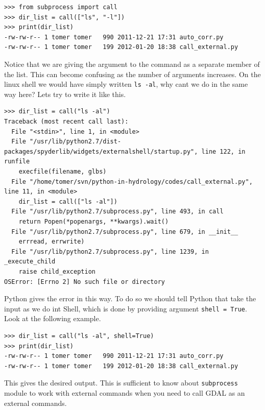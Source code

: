 \documentclass[10pt]{book}
\begin{document}
\beforeverb \begin{verbatim}
>>> from subprocess import call
>>> dir_list = call(["ls", "-l"])
>>> print(dir_list)
-rw-rw-r-- 1 tomer tomer   990 2011-12-21 17:31 auto_corr.py
-rw-rw-r-- 1 tomer tomer   199 2012-01-20 18:38 call_external.py
\end{verbatim} \afterverb
Notice that we are giving the argument to the command as a separate member of the list. This can become confusing as the number of arguments increases. On the linux shell we would have simply written \verb"ls -al", why cant we do in the same way here? Lets try to write it like this.
\beforeverb \begin{verbatim}
>>> dir_list = call("ls -al")
Traceback (most recent call last):
  File "<stdin>", line 1, in <module>
  File "/usr/lib/python2.7/dist-packages/spyderlib/widgets/externalshell/startup.py", line 122, in runfile
    execfile(filename, glbs)
  File "/home/tomer/svn/python-in-hydrology/codes/call_external.py", line 11, in <module>
    dir_list = call(["ls -al"])
  File "/usr/lib/python2.7/subprocess.py", line 493, in call
    return Popen(*popenargs, **kwargs).wait()
  File "/usr/lib/python2.7/subprocess.py", line 679, in __init__
    errread, errwrite)
  File "/usr/lib/python2.7/subprocess.py", line 1239, in _execute_child
    raise child_exception
OSError: [Errno 2] No such file or directory
\end{verbatim} \afterverb
Python gives the error in this way. To do so we should tell Python that take the input as we do int Shell, which is done by providing argument \verb"shell = True". Look at the following example.
\beforeverb \begin{verbatim}
>>> dir_list = call("ls -al", shell=True)
>>> print(dir_list)
-rw-rw-r-- 1 tomer tomer   990 2011-12-21 17:31 auto_corr.py
-rw-rw-r-- 1 tomer tomer   199 2012-01-20 18:38 call_external.py
\end{verbatim} \afterverb
This gives the desired output. This is sufficient to know about \verb"subprocess" module to work with external commands when you need to call GDAL as an external commands. 
\end{document}
